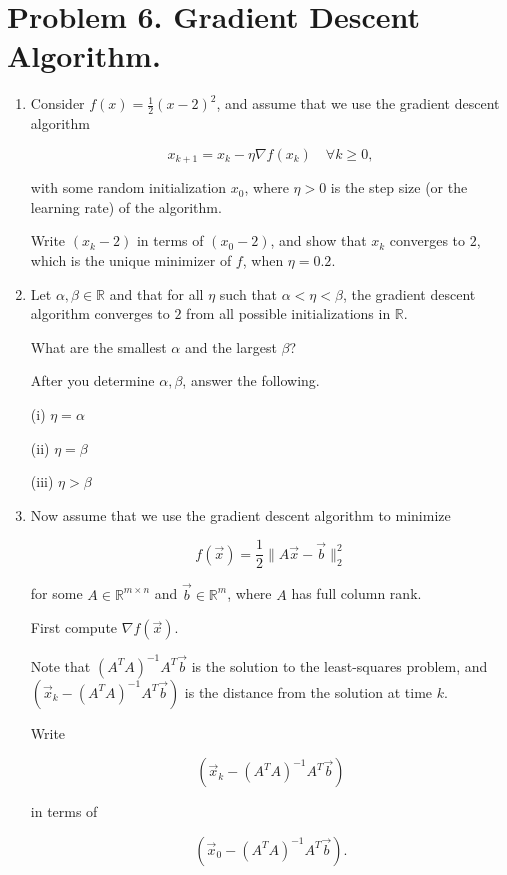 \documentclass[
  12pt,
]{fphw}
\begin{document}
\section*{Problem 6. Gradient Descent Algorithm.}


\begin{enumerate}

\item[(a)] Consider $f(x) = \frac{1}{2}(x - 2)^2$, and assume that we use the gradient descent algorithm

\[
x_{k+1} = x_k - \eta \nabla f(x_k) \quad \forall k \ge 0,
\]

with some random initialization $x_0$, where $\eta > 0$ is the step size (or the learning rate) of the algorithm.

Write $(x_k - 2)$ in terms of $(x_0 - 2)$, and show that $x_k$ converges to $2$, which is the unique minimizer of $f$, when $\eta = 0.2$.

\item[(b)] Let $\alpha, \beta \in \mathbb{R}$ and that for all $\eta$ such that $\alpha < \eta < \beta$, the gradient descent algorithm converges to $2$ from all possible initializations in $\mathbb{R}$.

What are the smallest $\alpha$ and the largest $\beta$?

After you determine $\alpha, \beta$, answer the following.

(i) $\eta = \alpha$

(ii) $\eta = \beta$

(iii) $\eta > \beta$

\item[(c)] Now assume that we use the gradient descent algorithm to minimize

\[
f(\vec{x}) =
\frac{1}{2}\|A\vec{x} - \vec{b}\|_2^2
\]

for some $A \in \mathbb{R}^{m\times n}$ and $\vec{b} \in \mathbb{R}^m$, where $A$ has full column rank.

First compute $\nabla f(\vec{x})$.

Note that $(A^T A)^{-1}A^T \vec{b}$ is the solution to the least-squares problem, and $(\vec{x}_k - (A^T A)^{-1}A^T\vec{b})$ is the distance from the solution at time $k$.

Write

\[
(\vec{x}_k - (A^T A)^{-1}A^T\vec{b})
\]

in terms of

\[
(\vec{x}_0 - (A^T A)^{-1}A^T\vec{b}).
\]


\end{enumerate}
\end{document}
